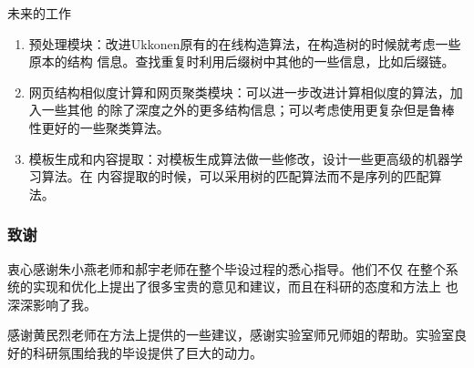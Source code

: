 \begin{frame}[label=sec-4-2]{未来的工作}
\begin{enumerate}[<+->]
\item 预处理模块：改进Ukkonen原有的在线构造算法，在构造树的时候就考虑一些原本的结构
信息。查找重复时利用后缀树中其他的一些信息，比如后缀链。
\item 网页结构相似度计算和网页聚类模块：可以进一步改进计算相似度的算法，加入一些其他
的除了深度之外的更多结构信息；可以考虑使用更复杂但是鲁棒性更好的一些聚类算法。
\item 模板生成和内容提取：对模板生成算法做一些修改，设计一些更高级的机器学习算法。在
内容提取的时候，可以采用树的匹配算法而不是序列的匹配算法。
\end{enumerate}
\end{frame}

\begin{frame}[t]
  \frametitle{致谢}
  \begin{block}{}
    衷心感谢朱小燕老师和郝宇老师在整个毕设过程的悉心指导。他们不仅
    在整个系统的实现和优化上提出了很多宝贵的意见和建议，而且在科研的态度和方法上
    也深深影响了我。
    \par
    感谢黄民烈老师在方法上提供的一些建议，感谢实验室师兄师姐的帮助。实验室良好的科研氛围给我的毕设提供了巨大的动力。
      
  \end{block}

\end{frame}


